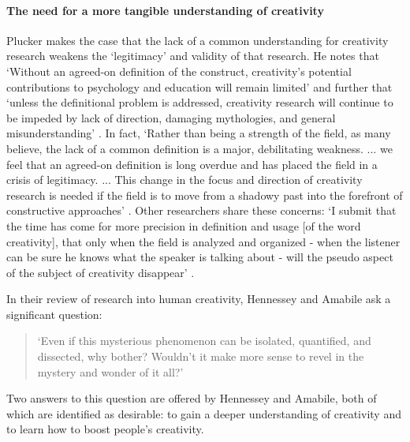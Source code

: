 \documentclass[10pt,letterpaper]{article}
\begin{document}
\paragraph{The need for a more tangible understanding of creativity}

Plucker makes the case that the lack of a common understanding for creativity research weakens the `legitimacy' and validity of that research. He notes that `Without an agreed-on definition of the construct, creativity's potential contributions to psychology and education will remain limited' \cite[p.87]{plucker04defn} and further that  `unless the definitional problem is addressed, creativity research will continue to be impeded by lack of direction, damaging mythologies, and general misunderstanding' \cite[p.92]{plucker04defn}. In fact, `Rather than being a strength of the field, as many believe, the lack of a common definition is a major, debilitating weakness. ... we feel that an agreed-on definition is long overdue and has placed the field in a crisis of legitimacy. ... This change in the focus and direction of creativity research is needed if the field is to move from a shadowy past into the forefront of constructive approaches' \cite[p. 93]{plucker04defn}. Other researchers share these concerns: `I submit that the time has come for more precision in definition and usage [of the word creativity], that only when the field is analyzed and organized - when the listener can be sure he knows what the speaker is talking about - will the pseudo aspect of the subject of creativity disappear'
\cite[p. 310]{rhodes61}.

In their review of research into human creativity, Hennessey and Amabile ask a significant question: 
\begin{quote}
`Even if this mysterious phenomenon can be isolated, quantified, and dissected, why bother? Wouldn't it make more sense to revel in the mystery and wonder of it all?' 
\cite[p. 570]{hennessey10}
\end{quote}

\noindent Two answers to this question are offered by Hennessey and Amabile, both of which are identified as desirable: to gain a deeper understanding of creativity and to learn how to boost people's creativity.
\end{document}
